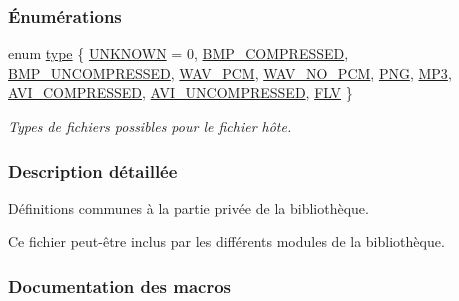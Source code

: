 \subsubsection*{Énumérations}
\begin{DoxyCompactItemize}
\item 
enum \hyperlink{a00047_a7aead736a07eaf25623ad7bfa1f0ee2d}{type} \{ \newline
\hyperlink{a00047_a7aead736a07eaf25623ad7bfa1f0ee2da6ce26a62afab55d7606ad4e92428b30c}{U\+N\+K\+N\+O\+WN} = 0, 
\hyperlink{a00047_a7aead736a07eaf25623ad7bfa1f0ee2da9573d9b7bb7b633a06929d27f8e90e21}{B\+M\+P\+\_\+\+C\+O\+M\+P\+R\+E\+S\+S\+ED}, 
\hyperlink{a00047_a7aead736a07eaf25623ad7bfa1f0ee2daefc7cfb01e9ffdac79f60659489429c0}{B\+M\+P\+\_\+\+U\+N\+C\+O\+M\+P\+R\+E\+S\+S\+ED}, 
\hyperlink{a00047_a7aead736a07eaf25623ad7bfa1f0ee2daca6d0756a91c2083dbad62c83d0be38a}{W\+A\+V\+\_\+\+P\+CM}, 
\newline
\hyperlink{a00047_a7aead736a07eaf25623ad7bfa1f0ee2da05986f8348197bcc7c4ac587d122852c}{W\+A\+V\+\_\+\+N\+O\+\_\+\+P\+CM}, 
\hyperlink{a00047_a7aead736a07eaf25623ad7bfa1f0ee2da842c5fc4bbe3f780e57c76d1a3cafe9f}{P\+NG}, 
\hyperlink{a00047_a7aead736a07eaf25623ad7bfa1f0ee2da4449f604829c7a948e359aeb0b9b6508}{M\+P3}, 
\hyperlink{a00047_a7aead736a07eaf25623ad7bfa1f0ee2da8be9d15a34dc2faad0683156eb0a1955}{A\+V\+I\+\_\+\+C\+O\+M\+P\+R\+E\+S\+S\+ED}, 
\newline
\hyperlink{a00047_a7aead736a07eaf25623ad7bfa1f0ee2da2c36dc6c8b804f634a89da3f50f90c07}{A\+V\+I\+\_\+\+U\+N\+C\+O\+M\+P\+R\+E\+S\+S\+ED}, 
\hyperlink{a00047_a7aead736a07eaf25623ad7bfa1f0ee2da3648fb67ff3ff0f5baefbff1eb09b651}{F\+LV}
 \}\begin{DoxyCompactList}\small\item\em Types de fichiers possibles pour le fichier hôte. \end{DoxyCompactList}
\end{DoxyCompactItemize}


\subsubsection{Description détaillée}
Définitions communes à la partie privée de la bibliothèque. 

Ce fichier peut-\/être inclus par les différents modules de la bibliothèque. 

\subsubsection{Documentation des macros}
\mbox{\label{a00047_a8b3aa3f669b97d484ddaf145ca9380ef}} 
